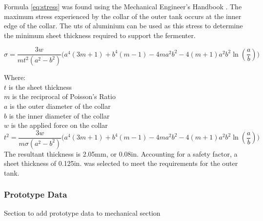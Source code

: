 \documentclass{article}
\begin{document}
Formula \ref{eq:stress} was found using the Mechanical Engineer's Handbook \cite{mech-handbook}.
The maximum stress experienced by the collar of the outer tank occurs at the inner edge of the collar.  The \gls{uts} of aluminium can be used as this stress to determine the minimum sheet thickness required to support the fermenter.

\begin{equation}
\sigma = \frac{3w}{mt^{2}(a^{2} - b^{2})}\Big(a^{4}(3m + 1) + b^{4}(m - 1) - 4ma^{2}b^{2} - 4(m + 1)a^{2}b^{2}\ln(\frac{a}{b}) \Big)
\label{eq:stress}
\end{equation}

\noindent Where: \\
$t$ is the sheet thickness\\
$m$ is the reciprocal of Poisson's Ratio\\
$a$ is the outer diameter of the collar\\
$b$ is the inner diameter of the collar\\
$w$ is the applied force on the collar\\

\begin{equation}
t^{2} = \frac{3w}{m\sigma(a^{2} - b^{2})}\Big(a^{4}(3m + 1) + b^{4}(m - 1) - 4ma^{2}b^{2} - 4(m + 1)a^{2}b^{2}\ln(\frac{a}{b}) \Big)
\end{equation}
The resultant thickness is 2.05mm, or 0.08in. Accounting for a safety factor, a sheet thickness of 0.125in. was selected to meet the requirements for the outer tank.

\subsubsection{Prototype Data}
Section to add prototype data to mechanical section
\end{document}
